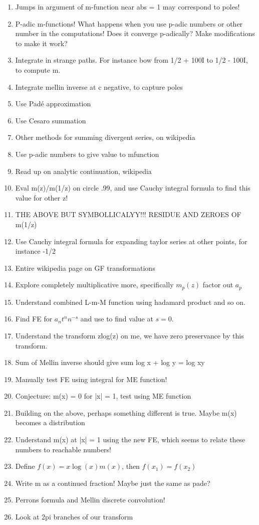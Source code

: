 \documentclass[a4paper]{amsart}
\begin{document}
\begin{enumerate}
  \item Jumps in argument of m-function near abs = 1 may correspond to poles!
  \item P-adic m-functions! What happens when you use p-adic numbers or other number in the computations! Does it converge p-adically? Make modifications to make it work?
  \item Integrate in strange paths. For instance bow from 1/2 + 100I to 1/2 - 100I, to compute m.
  \item Integrate mellin inverse at c negative, to capture poles
  \item Use Padé approximation
  \item Use Cesaro summation
  \item Other methods for summing divergent series, on wikipedia
  \item Use p-adic numbers to give value to mfunction
  \item Read up on analytic continuation, wikipedia
  \item Eval m(z)/m(1/z) on circle .99, and use Cauchy integral formula to find this value for other z!
  \item THE ABOVE BUT SYMBOLLICALYY!!! RESIDUE AND ZEROES OF m(1/z)
  \item Use Cauchy integral formula for expanding taylor series at other points, for instance -1/2
  \item Entire wikipedia page on GF transformations
  \item Explore completely multiplicative more, specifically $m_p(z)$ factor out $a_p$
  \item Understand combined L-m-M function using hadamard product and so on.
  \item Find FE for $a_nt^nn^{-s}$ and use to find value at $s = 0$.
  \item Understand the transform zlog(z) on me, we have zero preservance by this transform.
  \item Sum of Mellin inverse should give sum log x + log y = log xy
  \item Manually test FE using integral for ME function!
  \item Conjecture: m(x) = 0 for |x| = 1, test using ME function
  \item Building on the above, perhaps something different is true. Maybe m(x) becomes a distribution
  \item Understand m(x) at |x| = 1 using the new FE, which seems to relate these numbers to reachable numbers!
  \item Define $f(x) = x\log(x)m(x)$, then $f(x_1) = f(x_2)$
  \item Write m as a continued fraction! Maybe just the same as pade?
  \item Perrons formula and Mellin discrete convolution!
  \item Look at 2pi branches of our transform
\end{enumerate}
\end{document}
